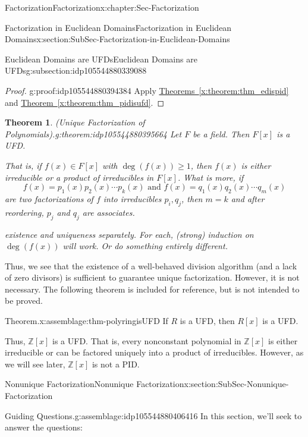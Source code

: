 \documentclass[oneside,10pt,]{book}
\newcommand{\xreffont}{\relax}
\numberwithin{equation}{section}
\renewcommand{\ge}{\geqslant}
\def\Z{{\mathbb Z}}
\newtheorem{theorem}{Theorem}[section]
\begin{document}
\begin{chapterptx}{Factorization}{}{Factorization}{}{}{x:chapter:Sec-Factorization}
\begin{sectionptx}{Factorization in Euclidean Domains}{}{Factorization in Euclidean Domains}{}{}{x:section:SubSec-Factorization-in-Euclidean-Domains}
\begin{subsectionptx}{Euclidean Domains are UFDs}{}{Euclidean Domains are UFDs}{}{}{g:subsection:idp105544880339088}
\begin{proof}{}{g:proof:idp105544880394384}
Apply \hyperref[x:theorem:thm_edispid]{Theorems~{\xreffont\ref{x:theorem:thm_edispid}}} and \hyperref[x:theorem:thm_pidisufd]{Theorem~{\xreffont\ref{x:theorem:thm_pidisufd}}}.%
\end{proof}
\begin{theorem}{(Unique Factorization of Polynomials).}{}{g:theorem:idp105544880395664}%
Let \(F\) be a field. Then \(F[x]\) is a UFD.%
\par
That is, if \(f(x) \in F[x]\) with \(\deg(f(x)) \ge 1\), then \(f(x)\) is either irreducible or a product of irreducibles in \(F[x]\). What is more, if%
\begin{equation*}
f(x) = p_1(x) p_2(x) \cdots p_k(x) \text{ and }  f(x) = q_1(x) q_2(x) \cdots q_m(x)
\end{equation*}
are two factorizations of \(f\) into irreducibles \(p_i, q_j\), then \(m=k\) and after reordering, \(p_j\) and \(q_j\) are associates.%
\par\smallskip%
\noindentHandle existence and uniqueness separately. For each, (strong) induction on \(\deg(f(x))\) will work. Or do something entirely different.%
\end{theorem}
Thus, we see that the existence of a well-behaved division algorithm (and a lack of zero divisors) is sufficient to guarantee unique factorization. However, it is not necessary. The following theorem is included for reference, but is not intended to be proved.%
\begin{assemblage}{Theorem.}{x:assemblage:thm-polyringisUFD}%
If \(R\) is a UFD, then \(R[x]\) is a UFD.%
\end{assemblage}
Thus, \(\Z[x]\) is a UFD. That is, every nonconstant polynomial in \(\Z[x]\) is either irreducible or can be factored uniquely into a product of irreducibles.  However, as we will see later, \(\Z[x]\) is not a PID.%
\end{subsectionptx}
\end{sectionptx}
%
%
\typeout{************************************************}
\typeout{************************************************}
%
\begin{sectionptx}{Nonunique Factorization}{}{Nonunique Factorization}{}{}{x:section:SubSec-Nonunique-Factorization}
\begin{assemblage}{Guiding Questions.}{g:assemblage:idp105544880406416}%
In this section, we'll seek to answer the questions: %
\begin{itemize}[label=\textbullet]

\end{itemize}
\end{assemblage}
\end{sectionptx}
\end{chapterptx}
\end{document}
